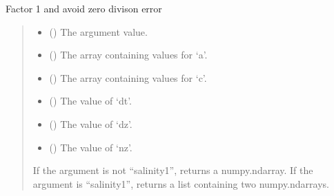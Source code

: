 \documentclass[a4paper,11pt,english,openany]{sphinxmanual}
\begin{document}
\begin{fulllineitems}
\begin{fulllineitems}
\label{\detokenize{api/spyice.models.advection_diffusion:spyice.models.advection_diffusion.AdvectionDiffusion.factor_1}}
\pysigstartsignatures
{}
\pysigstopsignatures
\sphinxAtStartPar
Factor 1 and avoid zero divison error
\begin{quote}\begin{description}
\begin{itemize}
\item {} 
\sphinxAtStartPar
{} () \textendash{} The argument value.

\item {} 
\sphinxAtStartPar
{} () \textendash{} The array containing values for ‘a’.

\item {} 
\sphinxAtStartPar
{} () \textendash{} The array containing values for ‘c’.

\item {} 
\sphinxAtStartPar
{} () \textendash{} The value of ‘dt’.

\item {} 
\sphinxAtStartPar
{} () \textendash{} The value of ‘dz’.

\item {} 
\sphinxAtStartPar
{} () \textendash{} The value of ‘nz’.

\end{itemize}

\sphinxAtStartPar
\begin{description}
\sphinxAtStartPar
If the argument is not “salinity1”, returns a numpy.ndarray.
If the argument is “salinity1”, returns a list containing two numpy.ndarrays.


\end{description}
\end{description}
\end{quote}
\end{fulllineitems}
\end{fulllineitems}
\end{document}
